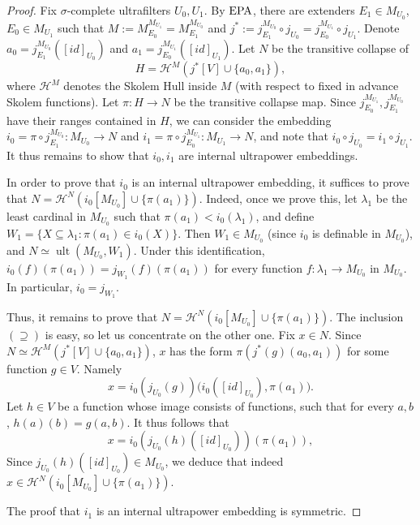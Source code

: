 \documentclass{article}
\theoremstyle{definition}
\theoremstyle{plain}
\DeclareMathOperator{\Ult}{ult}
\begin{document}
\begin{proof}
    Fix $\sigma$-complete ultrafilters $U_0, U_1$. By ${\rm EPA}$, there are extenders $E_1\in M_{U_0}$, $E_0\in M_{U_1}$ such that $M:=M^{M_{U_1}}_{E_0} = M^{M_{U_0}}_{E_1}$ and $j^*:=j^{M_{U_0}}_{E_1}\circ j_{U_0} = j^{M_{U_1}}_{E_0}\circ j_{U_1}$. Denote $a_0 = j^{M_{U_0}}_{E_1}([id]_{U_0})$ and $a_1 = j^{M_{U_1}}_{E_0}([id]_{U_1})$. Let $N$ be the transitive collapse of 
    $$H =\mathcal{H}^M( j^*[V]\cup \{a_0,a_1\} ), $$
    where $\mathcal{H}^M$ denotes the Skolem Hull inside $M$ (with respect to fixed in advance Skolem functions). Let $\pi\colon H\to N$ be the transitive collapse map. Since $j^{M_{U_1}}_{E_0}, j^{M_{U_0}}_{E_1}$ have their ranges contained in $H$, we can consider the embedding $i_0 = \pi\circ j^{M_{U_0}}_{E_1}\colon M_{U_0}\to N$ and $i_1 = \pi\circ j^{M_{U_1}}_{E_0}\colon M_{U_1}\to N$, and note that $i_0\circ j_{U_0} = i_1\circ j_{U_1}$. It thus remains to show that $i_0,i_1$ are internal ultrapower embeddings.

    In order to prove that $i_0$ is an internal ultrapower embedding, it suffices to prove that $N = \mathcal{H}^{N}\left( i_0[M_{U_0}]\cup \{ \pi(a_1) \} \right)$. Indeed, once we prove this, let $\lambda_1$ be the least cardinal in $M_{U_0}$ such that $ \pi(a_1)<i_0(\lambda_1)$, and define $W_1 = \{ X\subseteq \lambda_1 \colon \pi(a_1)\in i_0(X) \}$. Then $W_1\in M_{U_0}$ (since $i_0$ is definable in $M_{U_0}$), and $N\simeq \Ult( M_{U_0}, W_1 )$. Under this identification, $i_0( f )( \pi(a_1) ) = j_{W_1}(f)(  \pi(a_1))$ for every function $f\colon \lambda_1\to M_{U_0}$ in $M_{U_0}$. In particular, $i_0 = j_{W_1}$.

    Thus, it remains to prove that $N = \mathcal{H}^{N}\left( i_0[M_{U_0}]\cup \{ \pi(a_1) \} \right)$. The inclusion $(\supseteq)$ is easy, so let us concentrate on the other one. Fix $x\in N$. Since $N \simeq \mathcal{H}^M\left( j^*[V]\cup \{a_0,a_1\} \right)$, $x$ has the form $\pi( j^*(g)(a_0,a_1) )$ for some function $g\in V$. Namely 
    $$ x = i_0(  j_{U_0}(g)  ) \bigl( i_0\left( [ id ]_{U_0}\right), \pi(a_1) \bigr). $$
    Let $h\in V$ be a function whose image consists of functions, such that for every $a,b$, $h(a)(b) = g(a,b)$. It thus follows that
    $$ x = i_0\left( j_{U_0}(h)( [id]_{U_0} ) \right)( \pi(a_1) ),$$
    Since $j_{U_0}(h)( [id]_{U_0} )\in M_{U_0}$, we deduce that indeed $x\in \mathcal{H}^N( i_0[ M_{U_0} ]\cup \{ \pi(a_1) \} )$.

    The proof that $i_1$ is an internal ultrapower embedding is symmetric.
\end{proof}
\end{document}
